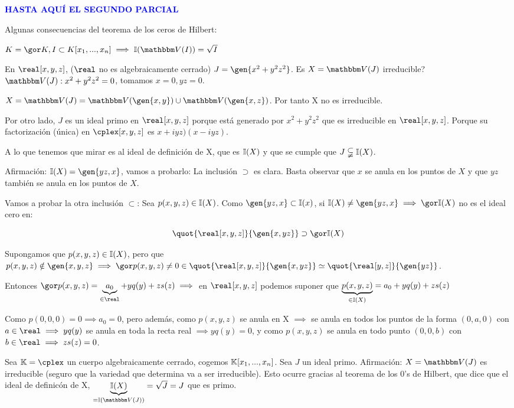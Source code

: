\textcolor{blue}{\textbf{HASTA AQUÍ EL SEGUNDO PARCIAL}}

Algunas consecuencias del teorema de  los ceros de Hilbert:

$K=\cls{K}, I\subset K[x_1,...,x_n] \implies \I(\V(I))=\sqrt{I}$

\begin{example}
	En $\real[x,y,z]$, ($\real$ no es algebraicamente cerrado) $J=\gen{x^2+y^2z^2}$. Es $X=\V(J)$ irreducible? $\V(J):x^2+y^2z^2=0$, tomamos $x=0, yz=0$.

	$X=\V(J)=\V(\gen{x,y})\cup\V(\gen{x,z})$. Por tanto X no es irreducible.

	Por otro lado, $J$ es un ideal primo en $\real[x,y,z]$ porque está generado por $x^2+y^2z^2$ que es irreducible en $\real[x,y,z]$. Porque su factorización (única) en $\cplex[x,y,z]$ es $x+iyz)(x-iyz)$.

	A lo que tenemos que mirar es al ideal de definición de X, que es $\mathbb{I}(X)$ y que se cumple que $J \subsetneqq \mathbb{I}(X)$.

	Afirmación: $ \I(X)=\gen{yz,x}$, vamos a probarlo:
	La inclusión $\supset$ es clara. Basta observar que $x$ se anula en los puntos de $X$ y que $yz$ también se anula en los puntos de $X$.

	Vamos a probar la otra inclusión $\subset$: Sea $p(x,y,z) \in \mathbb{I}(X)$. Como $\gen{yz,x} \subset \I(x)$, si $\I(X) \neq \gen{yz,x} \implies \cls{\I(X)}$ no es el ideal cero en:

	$$ \quot{\real[x,y,z]}{\gen{x,yz}} \supset \cls{\I(X)} $$

	Supongamos que $p(x,y,z) \in \mathbb{I}(X)$, pero que $p(x,y,z) \notin \gen{x,y,z} \implies \cls{p(x,y,z)} \neq 0 \in \quot{\real[x,y,z]}{\gen{x,yz}} \simeq \quot{\real[y,z]}{\gen{yz}}$.

	Entonces $\cls{p(x,y,z)}=\underbrace{a_0}_{\in \real}+yq(y)+zs(z) \implies$ en $\real[x,y,z]$ podemos suponer que $\underbrace{p(x,y,z)}_{\in \mathbb{I}(X)}=a_0+yq(y)+zs(z)$

	Como $p(0,0,0)=0 \implies a_0=0$, pero además, como $p(x,y,z)$ se anula en X $\implies$ se anula en todos los puntos de la forma $(0,a,0)$ con $a\in \real \implies yq(y)$ se anula en toda la recta real $\implies yq(y)=0$, y como $p(x,y,z)$ se anula en todo punto $(0,0,b)$ con $b\in \real \implies zs(z)=0$.
\end{example}


\begin{example}
	Sea $\K=\cplex$ un cuerpo algebraicamente cerrado, cogemos $\mathbb{K}[x_1,...,x_n]$. Sea $J$ un ideal primo. Afirmación: $X=\V(J)$ es irreducible (seguro que la variedad que determina va a ser irreducible). Esto ocurre gracias al teorema de los 0's de Hilbert, que dice que el ideal de definicón de X, $\underbrace{\I(X)}_{=\I(\V(J))}=\sqrt{J}=J$ que es primo.
\end{example}

